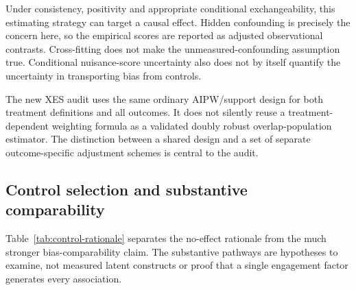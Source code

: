 Under consistency, positivity and appropriate conditional exchangeability, this estimating strategy can target a causal effect. Hidden confounding is precisely the concern here, so the empirical scores are reported as adjusted observational contrasts. Cross-fitting does not make the unmeasured-confounding assumption true. Conditional nuisance-score uncertainty also does not by itself quantify the uncertainty in transporting bias from controls.

The new XES audit uses the same ordinary AIPW/support design for both treatment definitions and all outcomes. It does not silently reuse a treatment-dependent weighting formula as a validated doubly robust overlap-population estimator. The distinction between a shared design and a set of separate outcome-specific adjustment schemes is central to the audit.

\subsection{Control selection and substantive comparability}

Table~\ref{tab:control-rationale} separates the no-effect rationale from the much stronger bias-comparability claim. The substantive pathways are hypotheses to examine, not measured latent constructs or proof that a single engagement factor generates every association.

